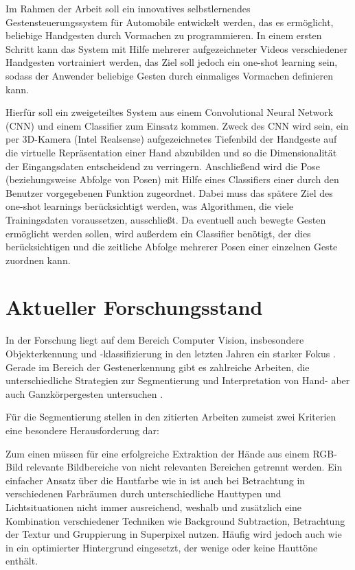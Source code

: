 \documentclass[12pt, a4paper]{book}
\begin{document}
Im Rahmen der Arbeit soll ein innovatives selbstlernendes Gestensteuerungssystem für Automobile entwickelt werden, das es ermöglicht, beliebige Handgesten durch Vormachen zu programmieren. In einem ersten Schritt kann das System mit Hilfe mehrerer aufgezeichneter Videos verschiedener Handgesten vortrainiert werden, das Ziel soll jedoch ein one-shot learning sein, sodass der Anwender beliebige Gesten durch einmaliges Vormachen definieren kann.

Hierfür soll ein zweigeteiltes System aus einem Convolutional Neural Network (CNN) und einem Classifier zum Einsatz kommen. Zweck des CNN wird sein, ein per 3D-Kamera (Intel Realsense) aufgezeichnetes Tiefenbild der Handgeste auf die virtuelle Repräsentation einer Hand abzubilden und so die Dimensionalität der Eingangsdaten entscheidend zu verringern. Anschließend wird die Pose (beziehungsweise Abfolge von Posen) mit Hilfe eines Classifiers einer durch den Benutzer vorgegebenen Funktion zugeordnet. Dabei muss das spätere Ziel des one-shot learnings berücksichtigt werden, was Algorithmen, die viele Trainingsdaten voraussetzen, ausschließt. Da eventuell auch bewegte Gesten ermöglicht werden sollen, wird außerdem ein Classifier benötigt, der dies berücksichtigen und die zeitliche Abfolge mehrerer Posen einer einzelnen Geste zuordnen kann.

\section{Aktueller Forschungsstand}
In der Forschung liegt auf dem Bereich Computer Vision, insbesondere Objekterkennung und -klassifizierung in den letzten Jahren ein starker Fokus \cite{FeiFei}. Gerade im Bereich der Gestenerkennung gibt es zahlreiche Arbeiten, die unterschiedliche Strategien zur Segmentierung und Interpretation von Hand- aber auch Ganzkörpergesten untersuchen \cite{Zimmermann03.05.2017,Sato1317March2001,Supancic2018,Tompson2014,Zhang23.10.2016,OhnBar2014,Ge2019,Keskin2012,Li2013,Jones2002}. 


Für die Segmentierung stellen in den zitierten Arbeiten zumeist zwei Kriterien eine besondere Herausforderung dar:

Zum einen müssen für eine erfolgreiche Extraktion der Hände aus einem RGB-Bild relevante Bildbereiche von nicht relevanten Bereichen getrennt werden. Ein einfacher Ansatz über die Hautfarbe wie in \cite{Sato1317March2001} ist auch bei Betrachtung in verschiedenen Farbräumen durch unterschiedliche Hauttypen und Lichtsituationen nicht immer ausreichend, weshalb \cite{Zhang23.10.2016} und \cite{Li2013} zusätzlich eine Kombination verschiedener Techniken wie Background Subtraction, Betrachtung der Textur und Gruppierung in Superpixel nutzen. Häufig wird jedoch auch wie in \cite{Sridhar2013} ein optimierter Hintergrund eingesetzt, der wenige oder keine Hauttöne enthält.
\end{document}
